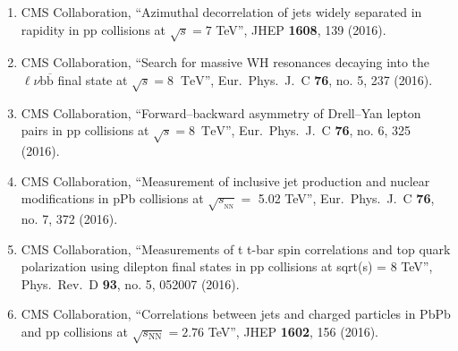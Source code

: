 \begin{enumerate}
\item CMS Collaboration, ``Azimuthal decorrelation of jets widely separated in rapidity in pp collisions at $ \sqrt{s}=7 $ TeV'', JHEP {\bf 1608}, 139 (2016).

\item CMS Collaboration, ``Search for massive WH resonances decaying into the $\ell \nu \mathrm{b} \overline{\mathrm{b}} $ final state at $\sqrt{s}=8$ $~\text {TeV}$'', Eur.\ Phys.\ J.\ C {\bf 76}, no. 5, 237 (2016).

\item CMS Collaboration, ``Forward–backward asymmetry of Drell–Yan lepton pairs in pp collisions at $\sqrt{s} = 8$ $\,\mathrm{TeV}$'', Eur.\ Phys.\ J.\ C {\bf 76}, no. 6, 325 (2016).

\item CMS Collaboration, ``Measurement of inclusive jet production and nuclear modifications in pPb collisions at $\sqrt{s_{_\mathrm {NN}}} =$ 5.02 TeV'', Eur.\ Phys.\ J.\ C {\bf 76}, no. 7, 372 (2016).

\item CMS Collaboration, ``Measurements of t t-bar spin correlations and top quark polarization using dilepton final states in pp collisions at sqrt(s) = 8 TeV'', Phys.\ Rev.\ D {\bf 93}, no. 5, 052007 (2016).

\item CMS Collaboration, ``Correlations between jets and charged particles in PbPb and pp collisions at $ \sqrt{s_{\mathrm{NN}}}=2.76 $ TeV'', JHEP {\bf 1602}, 156 (2016).


\end{enumerate}
